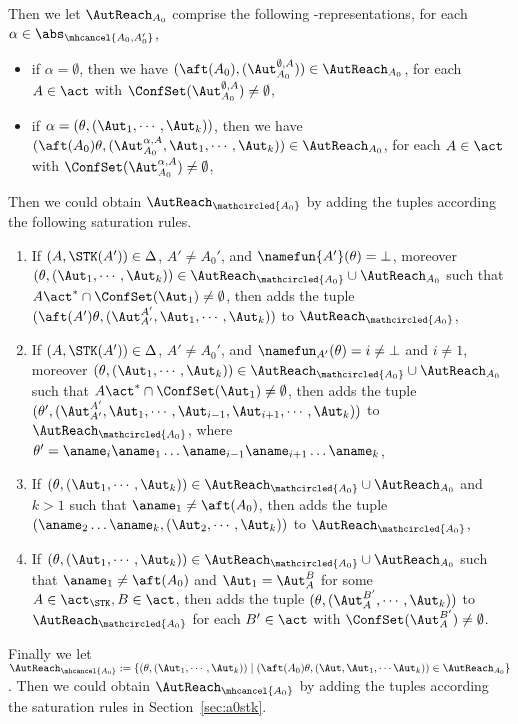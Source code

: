 Then we let $\AutReach_{A_0}$ comprise the following {\WOTrNFA}-representations, for each $\alpha\in\abs_{\mhcancel{A_0,A_0'}}$,
\begin{itemize}
    \item if $\alpha = \emptyset$, then we have $(\aft(A_0),(\Aut_{A_0}^{\emptyset,A}))\in\AutReach_{A_0}$,
        for each $A\in\act$ with $\ConfSet(\Aut_{A_0}^{\emptyset,A})\neq\emptyset$,
    \item if $\alpha = (\theta,(\Aut_1,\cdots,\Aut_k))$, then we have $(\aft(A_0)\theta,(\Aut_{A_0}^{\alpha,A},\Aut_1,\cdots,\Aut_k))\in\AutReach_{A_0}$,
        for each $A\in\act$ with $\ConfSet(\Aut_{A_0}^{\alpha,A})\neq\emptyset$,
\end{itemize}
Then we could obtain $\AutReach_{\mathcircled{A_0}}$ by adding the tuples according the following saturation rules.

\smallskip
\fbox
{
\begin{minipage}{0.9\textwidth}
\begin{enumerate}
    \item If $(A,\STK(A')) \in\Delta$, $A'\neq A_0'$, and $\namefun{A'}(\theta) = \bot$, moreover $(\theta, (\Aut_1,\cdots,\Aut_k)) \in \AutReach_{\mathcircled{A_0}}\cup\AutReach_{A_0}$ such that $A\act^*\cap\ConfSet(\Aut_1)\neq \emptyset$, 
        then adds the tuple $(\aft(A')\theta, (\Aut_{A'}^{A'},\Aut_1,\cdots,\Aut_k))$ to $\AutReach_{\mathcircled{A_0}}$,
    \item If $(A,\STK(A')) \in\Delta$, $A'\neq A_0'$, and $\namefun_{A'}(\theta) = i \neq\bot$ and $i\neq 1$, moreover $(\theta, (\Aut_1,\cdots,\Aut_k)) \in \AutReach_{\mathcircled{A_0}}\cup\AutReach_{A_0}$ such that $A\act^*\cap\ConfSet(\Aut_1)\neq \emptyset$, 
        then adds the tuple $(\theta', (\Aut_{A'}^{A'},\Aut_1,\cdots,\Aut_{i-1},\Aut_{i+1},\cdots,\Aut_{k}))$ to $\AutReach_{\mathcircled{A_0}}$, where $\theta' = \aname_i\aname_1\dots\aname_{i-1}\aname_{i+1}\dots\aname_k$,
    \item If $(\theta, (\Aut_1,\cdots,\Aut_k)) \in \AutReach_{\mathcircled{A_0}}\cup\AutReach_{A_0}$ and $k>1$ such that $\aname_1 \neq \aft(A_0)$, then adds the tuple $(\aname_2\dots\aname_k, (\Aut_2,\cdots,\Aut_k))$ to $\AutReach_{\mathcircled{A_0}}$,
    \item If $(\theta, (\Aut_1,\cdots,\Aut_k)) \in \AutReach_{\mathcircled{A_0}}\cup\AutReach_{A_0}$ such that $\aname_1\neq\aft(A_0)$ and $\Aut_1 = \Aut_A^B$ for some $A\in\act_{\STK},B\in\act$, then adds the tuple $(\theta, (\Aut_A^{B'},\cdots,\Aut_k))$ to $\AutReach_{\mathcircled{A_0}}$ for each $B'\in\act$ with $\ConfSet(\Aut_A^{B'})\neq\emptyset$.
\end{enumerate}
\end{minipage}
}

Finally we let $\AutReach_{\mhcancel{A_0}} := \{(\theta,(\Aut_1,\cdots,\Aut_k))\mid(\aft(A_0)\theta,(\Aut,\Aut_1,\cdots\Aut_k))\in\AutReach_{A_0}\}$. Then we could obtain $\AutReach_{\mhcancel{A_0}}$ by adding the tuples according the saturation rules in Section~\ref{sec:a0stk}.

